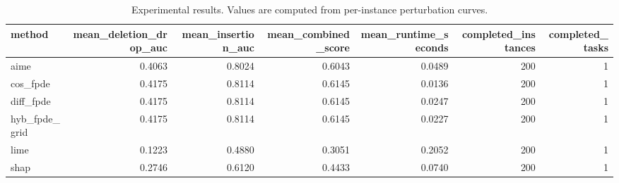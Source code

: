 \begin{table}[t]
\caption{Experimental results. Values are computed from per-instance perturbation curves.}
\label{tab:main_results_computed}
\centering
\begin{tabular}{lrrrrrr}
\toprule
method & mean\_deletion\_drop\_auc & mean\_insertion\_auc & mean\_combined\_score & mean\_runtime\_seconds & completed\_instances & completed\_tasks \\
\midrule
aime & 0.4063 & 0.8024 & 0.6043 & 0.0489 & 200 & 1 \\
cos\_fpde & 0.4175 & 0.8114 & 0.6145 & 0.0136 & 200 & 1 \\
diff\_fpde & 0.4175 & 0.8114 & 0.6145 & 0.0247 & 200 & 1 \\
hyb\_fpde\_grid & 0.4175 & 0.8114 & 0.6145 & 0.0227 & 200 & 1 \\
lime & 0.1223 & 0.4880 & 0.3051 & 0.2052 & 200 & 1 \\
shap & 0.2746 & 0.6120 & 0.4433 & 0.0740 & 200 & 1 \\
\bottomrule
\end{tabular}

\end{table}
